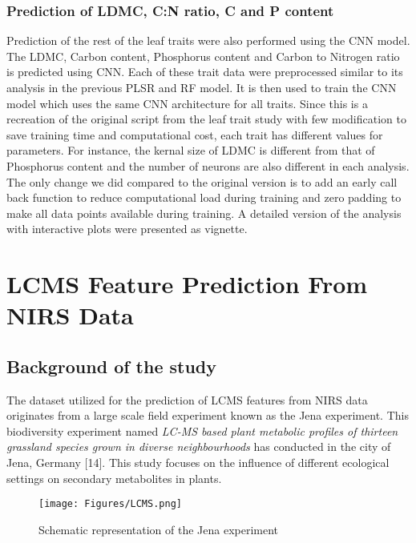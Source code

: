 \documentclass[12pt,a4paper]{report}
\begin{document}
\subsubsection*{Prediction of LDMC, C:N ratio, C and P content}
Prediction of the rest of the leaf traits were also performed using the CNN model. The LDMC, Carbon content, Phosphorus content and Carbon to Nitrogen ratio is predicted using CNN. Each of these trait data were preprocessed similar to its analysis in the previous PLSR and RF model. It is then used to train the CNN model which uses the same CNN architecture for all traits. Since this is a recreation of the original script from the leaf trait study with few modification to save training time and computational cost, each trait has different values for parameters. For instance, the kernal size of LDMC is different from that of Phosphorus content and the number of neurons are also different in each analysis. The only change we did compared to the original version is to add an early call back function to reduce computational load during training and zero padding to make all data points available during training. A detailed version of the analysis with interactive plots were presented as vignette. \\


\section{LCMS Feature Prediction From NIRS Data}

\subsection*{Background of the study}
The dataset utilized for the prediction of LCMS features from NIRS data originates from a large scale field experiment known as the Jena experiment. This biodiversity experiment named \textit{LC-MS based plant metabolic profiles of thirteen grassland species grown in diverse neighbourhoods} has conducted in the city of Jena, Germany [14]. This study focuses on the influence of different ecological settings on secondary metabolites in plants. \\

\begin{figure}[h]
    \centering
    \texttt{[image: Figures/LCMS.png]}
    \caption{Schematic representation of the Jena experiment}
    \label{fig:lcms}
\end{figure}
\end{document}

